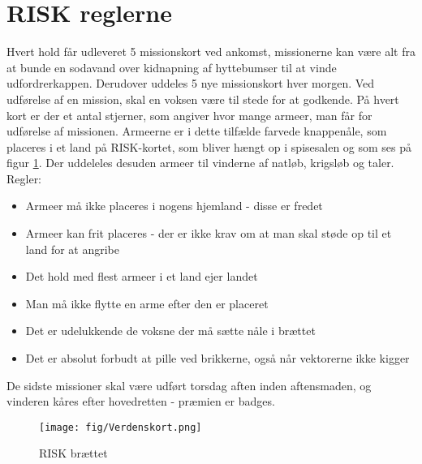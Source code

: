 \section{RISK reglerne}
Hvert hold får udleveret 5 missionskort ved ankomst, missionerne kan være alt fra at bunde en sodavand over kidnapning af hyttebumser til at vinde udfordrerkappen. Derudover uddeles 5 nye missionskort hver morgen. Ved udførelse af en mission, skal en voksen være til stede for at godkende. På hvert kort er der et antal stjerner, som angiver hvor mange armeer, man får for udførelse af missionen. Armeerne er i dette tilfælde farvede knappenåle, som placeres i et land på RISK-kortet, som bliver hængt op i spisesalen og som ses på figur \ref{fig:RISK}. Der uddeleles desuden armeer til vinderne af natløb, krigsløb og taler. Regler:
\begin{itemize}
  \item Armeer må ikke placeres i nogens hjemland - disse er fredet
  \item Armeer kan frit placeres - der er ikke krav om at man skal støde op til et land for at angribe
  \item Det hold med flest armeer i et land ejer landet
  \item Man må ikke flytte en arme efter den er placeret
  \item Det er udelukkende de voksne der må sætte nåle i brættet
  \item Det er absolut forbudt at pille ved brikkerne, også når vektorerne ikke kigger
\end{itemize}
De sidste missioner skal være udført torsdag aften inden aftensmaden, og vinderen  kåres efter hovedretten - præmien er badges.

\begin{figure}[H]
\centering
\texttt{[image: fig/Verdenskort.png]}
\caption{RISK brættet}
\label{fig:RISK}
\end{figure}